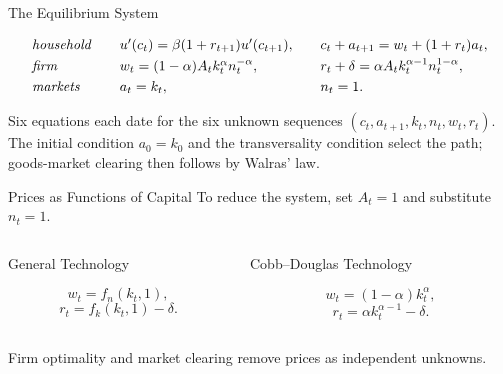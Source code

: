 \documentclass[11pt,aspectratio=169,c]{beamer}
\begin{document}
\begin{frame}{The Equilibrium System}
  \begin{propositionbox}
    \[
      \begin{array}{l@{\qquad}l@{\qquad}l}
        \text{\emph{household}}
          & u'(c_t)=\beta(1+r_{t+1})u'(c_{t+1}),
          & c_t+a_{t+1}=w_t+(1+r_t)a_t,\\[.3em]
        \text{\emph{firm}}
          & w_t=(1-\alpha)A_tk_t^\alpha n_t^{-\alpha},
          & r_t+\delta=\alpha A_tk_t^{\alpha-1}n_t^{1-\alpha},\\[.3em]
        \text{\emph{markets}}
          & a_t=k_t,
          & n_t=1 .
      \end{array}
    \]
  \end{propositionbox}

  Six equations each date for the six unknown sequences
  $(c_t,a_{t+1},k_t,n_t,w_t,r_t)$. The initial condition $a_0=k_0$ and the
  transversality condition select the path; goods-market clearing then follows
  by Walras' law.
\end{frame}

\begin{frame}{Prices as Functions of Capital}
  To reduce the system, set $A_t=1$ and substitute $n_t=1$.

  \begin{columns}[t,onlytextwidth]
    \begin{column}{\tightcolumnwidth}
      \begin{block}{General Technology}
        \begin{minipage}[t][2.05cm][t]{\dimexpr\linewidth-.76em\relax}
          \[
            w_t=f_n(k_t,1),
          \]
          \[
            r_t=f_k(k_t,1)-\delta.
          \]
        \end{minipage}
      \end{block}
    \end{column}
    \hspace{\twocolumngutter}
    \begin{column}{\tightcolumnwidth}
      \begin{block}{Cobb--Douglas Technology}
        \begin{minipage}[t][2.05cm][t]{\dimexpr\linewidth-.76em\relax}
          \[
            w_t=(1-\alpha)k_t^\alpha,
          \]
          \[
            r_t=\alpha k_t^{\alpha-1}-\delta.
          \]
        \end{minipage}
      \end{block}
    \end{column}
  \end{columns}

  \vspace{.45em}
  Firm optimality and market clearing remove prices as independent unknowns.
\end{frame}
\end{document}
